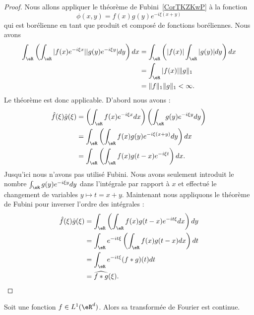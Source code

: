 \begin{proof}
    Nous allons appliquer le théorème de Fubini~\ref{CorTKZKwP} à la fonction
    \begin{equation}
        \phi(x,y)=f(x)g(y) e^{-i\xi(x+y)}
    \end{equation}
    qui est borélienne en tant que produit et composé de fonctions boréliennes. Nous avons
    \begin{subequations}
        \begin{align}
            \int_{\eR}\left( \int_{\eR}| f(x) e^{-i\xi x} | |g(y) e^{-i\xi y} |dy \right)dx&=\int_{\eR}\left( | f(x) |\int_{\eR}| g(y) |dy \right)dx\\
            &=\int_{\eR}| f(x) |\| g \|_1\\
            &=\| f \|_1\| g \|_1<\infty.
        \end{align}
    \end{subequations}
    Le théorème est donc applicable. D'abord nous avons :
    \begin{subequations}
        \begin{align}
            \hat f(\xi)\hat g(\xi)&=\left(\int_{\eR}f(x) e^{-i\xi x}dx\right)\left(\int_{\eR}g(y) e^{-i\xi y}dy\right)\\
            &=\int_{\eR}\left( \int_{\eR}f(x)g(y) e^{-i\xi(x+y)}dy \right)dx\\
            &=\int_{\eR}\left( \int_{\eR}f(x)g(t-x) e^{-i\xi t} \right)dx.
        \end{align}
    \end{subequations}
    Jusqu'ici nous n'avons pas utilisé Fubini. Nous avons seulement introduit le nombre \( \int_{\eR}g(y) e^{-i\xi y}dy\) dans l'intégrale par rapport à \( x\) et effectué le changement de variables \( y\mapsto t=x+y\). Maintenant nous appliquons le théorème de Fubini pour inverser l'ordre des intégrales :
    \begin{subequations}
        \begin{align}
            \hat f(\xi)\hat g(\xi)&=\int_{\eR}\left( \int_{\eR}f(x)g(t-x) e^{-it\xi}dx \right)dy\\
            &=\int_{\eR} e^{-it\xi}\left( \int_{\eR}f(x)g(t-x)dx \right)dt\\
            &=\int_{\eR} e^{-it\xi}(f*g)(t)dt\\
            &=\widehat{f*g}(\xi).
        \end{align}
    \end{subequations}
\end{proof}

\begin{proposition}       \label{PropJvNfj}
    Soit une fonction \( f\in L^1(\eR^d)\). Alors sa transformée de Fourier est continue.
\end{proposition}

